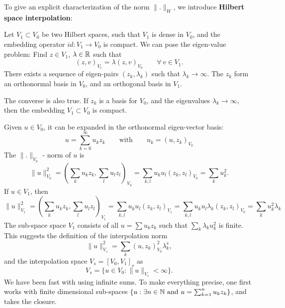 \bigskip

To give an explicit characterization of the norm $\|.\|_W$, we introduce
{\bf Hilbert space interpolation}:

Let $V_1 \subset V_0$ be two Hilbert spaces, such that $V_1$ is dense 
in $V_0$, and the embedding operator $id : V_1 \rightarrow V_0$
is compact. We can pose the eigen-value problem: Find $z \in V_1$, $\lambda \in {\mathbb R}$ such that
$$
(z, v)_{V_1} = \lambda (z, v)_{V_0} \qquad \forall \, v \in V_1.
$$
There exists a sequence of eigen-pairs $(z_k, \lambda_k)$ such that $\lambda_k
\rightarrow \infty$. The $z_k$ form an orthonormal basis in $V_0$, and
an orthogonal basis in $V_1$. 

\bigskip

The converse is also true. If $z_k$ is a basis for $V_0$, and the eigenvalues
$\lambda_k \rightarrow \infty$, then the embedding $V_1 \subset V_0$ is compact.

\bigskip

Given $u \in V_0$, it can be expanded in the orthonormal eigen-vector basis:
$$
u = \sum_{k=0}^\infty u_k z_k \qquad \mbox{with} \qquad u_k = (u, z_k)_{V_0}
$$
The $\|.\|_{V_0}$ - norm of $u$ is 
$$
\| u \|_{V_0}^2 = (\sum_k u_k z_k, \sum_l u_l z_l)_{V_0} = 
        \sum_{k,l} u_k u_l (z_k,z_l)_{V_0} = \sum_k u_k^2.
$$
If $u \in V_1$, then 
$$
\| u \|_{V_1}^2 = (\sum_k u_k z_k, \sum_l u_l z_l)_{V_1} = 
        \sum_{k,l} u_k u_l (z_k,z_l)_{V_1} = 
        \sum_{k,l} u_k u_l \lambda_k (z_k,z_l)_{V_0} = 
        \sum_k u_k^2 \lambda_k
$$
The sub-space space $V_1$ consists of all $u = \sum u_k z_k$ such 
that $\sum_k \lambda_k u_k^2$ is finite. This suggests the definition
of the interpolation norm
$$
\| u \|_{V_s}^2 = \sum_k (u, z_k)_{V_0}^2 \lambda_k^s,
$$
and the interpolation space $V_s = [V_0, V_1]_s$ as
$$
V_s = \{ u \in V_0 : \| u \|_{V_s} < \infty \}.
$$
We have been fast with using infinite sums. To make everything precise,
one first works with finite dimensional sub-spaces $\{ u : \exists n \in {\mathbb N} \mbox{ and } u = \sum_{k=1}^n u_k z_k \}$, and takes the closure.


\bigskip

